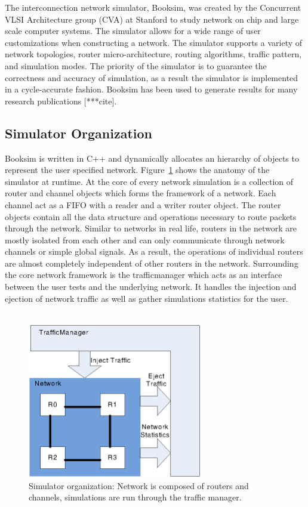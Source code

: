 
The interconnection network simulator, Booksim, was created by the Concurrent VLSI Architecture group (CVA) at Stanford to study network on chip and large scale computer systems. The simulator allows for a wide range of user customizations when constructing a network. The simulator supports a variety of network topologies, router micro-architecture, routing algorithms, traffic pattern, and simulation modes. The priority of the simulator is  to guarantee the correctness and accuracy of simulation, as a result the simulator is implemented in a cycle-accurate fashion. Booksim has been used to generate results for many research publications [***cite]. 
\subsection{Simulator Organization}
Booksim is written in C++ and dynamically allocates an hierarchy of objects to represent the user specified network. Figure~\ref{fig:simulator} shows the anatomy of the simulator at runtime. At the core of every network simulation is a collection of router and channel objects which forms the framework of a network. Each channel act as a FIFO with a reader and a writer router object. The router objects contain all the data structure and operations necessary to route packets through the network. Similar to networks in real life, routers in the network are mostly isolated from each other and can only communicate through network channels or simple global signals. As a result, the operations of individual routers are almost completely independent of other routers in the network. Surrounding the core network framework is the trafficmanager which acts as an interface between the user tests and the underlying network. It handles the injection and ejection of network traffic as well as gather simulations statistics for the user. \\
~\\
\begin{figure}[h]
\centering
\includegraphics[width=3in]{simulator.eps}
\caption{Simulator organization: Network is composed of routers and channels, simulations are run through the traffic manager. }
\label{fig:simulator}
\end{figure}
